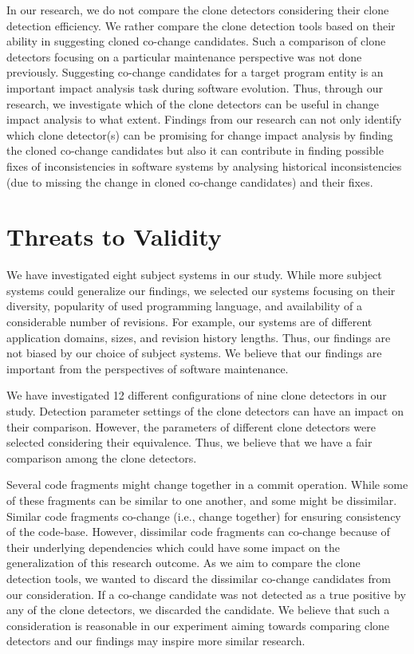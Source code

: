 \documentclass[review]{elsarticle}
\begin{document}
In our research, we do not compare the clone detectors considering their clone detection efficiency. We rather compare the clone detection tools based on their ability in suggesting cloned co-change candidates. Such a comparison of clone detectors focusing on a particular maintenance perspective was not done previously. Suggesting co-change candidates for a target program entity is an important impact analysis \cite{book-change-impact} task during software evolution. Thus, through our research, we investigate which of the clone detectors can be useful in change impact analysis to what extent. Findings from our research can not only identify which clone detector(s) can be promising for change impact analysis by finding the cloned co-change candidates but also it can contribute in finding possible fixes of inconsistencies in software systems by analysing historical inconsistencies (due to missing the change in cloned co-change candidates) and their fixes.  

\section{Threats to Validity}
\label{the-threat-validity}
We have investigated eight subject systems in our study. While more subject systems could generalize our findings, we selected our systems focusing on their diversity, popularity of used programming language, and availability of a considerable number of revisions. For example, our systems are of different application domains, sizes, and revision history lengths. Thus, our findings are not biased by our choice of subject systems. We believe that our findings are important from the perspectives of software maintenance.

We have investigated 12 different configurations of nine clone detectors in our study. 
Detection parameter settings of the clone detectors can have an impact on their comparison. However, the parameters of different clone detectors were selected considering their equivalence. Thus, we believe that we have a fair comparison among the clone detectors.

Several code fragments might change together in a commit operation. While some of these fragments can be similar to one another, and some might be dissimilar. Similar code fragments co-change (i.e., change together) for ensuring consistency of the code-base. However, dissimilar code fragments can co-change because of their underlying dependencies which could have some impact on the generalization of this research outcome. As we aim to compare the clone detection tools, we wanted to discard the dissimilar co-change candidates from our consideration. If a co-change candidate was not detected as a true positive by any of the clone detectors, we discarded the candidate. We believe that such a consideration is reasonable in our experiment aiming towards comparing clone detectors and our findings may inspire more similar research.
\end{document}
